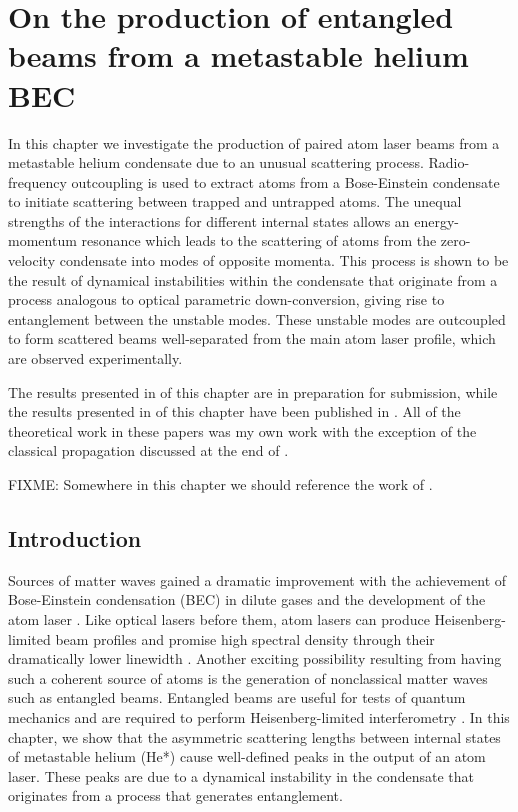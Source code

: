 \chapter{On the production of entangled beams from a metastable helium BEC}
\label{Peaks}
\graphicspath{{Figures/Peaks/}{Figures/Common/}}

In this chapter we investigate the production of paired atom laser beams from a metastable helium condensate due to an unusual scattering process.  Radio-frequency outcoupling is used to extract atoms from a Bose-Einstein condensate to initiate scattering between trapped and untrapped atoms.  The unequal strengths of the interactions for different internal states allows an energy-momentum resonance which leads to the scattering of atoms from the zero-velocity condensate into modes of opposite momenta.  This process is shown to be the result of dynamical instabilities within the condensate that originate from a process analogous to optical parametric down-conversion, giving rise to entanglement between the unstable modes.  These unstable modes are outcoupled to form scattered beams well-separated from the main atom laser profile, which are observed experimentally.

The results presented in  of this chapter are in preparation for submission, while the results presented in  of this chapter have been published in \citet{Dall:2009}.  All of the theoretical work in these papers was my own work with the exception of the classical propagation discussed at the end of .

FIXME: Somewhere in this chapter we should reference the work of \citet{Pu:2000,Duan:2000}.

\section{Introduction}
Sources of matter waves gained a dramatic improvement with the achievement of Bose-Einstein condensation (BEC) in dilute gases and the development of the atom laser \citep{Anderson:1995vn,Mewes:1997}. Like optical lasers before them, atom lasers can produce Heisenberg-limited beam profiles \citep{Busch:2002zr,Riou:2006uq} and promise high spectral density through their dramatically lower linewidth \citep{Wiseman:1997ba}. Another exciting possibility resulting from having such a coherent source of atoms is the generation of nonclassical matter waves such as entangled beams. Entangled beams are useful for tests of quantum mechanics and are required to perform Heisenberg-limited interferometry \citep{Dowling:1998,Reid:1988}.  In this chapter, we show that the asymmetric scattering lengths between internal states of metastable helium (He*) cause well-defined peaks in the output of an atom laser.  These peaks are due to a dynamical instability in the condensate that originates from a process that generates entanglement.

